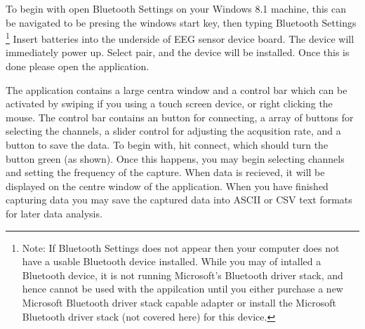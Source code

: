\documentclass[]{article}
\begin{document}
To begin with open Bluetooth Settings on your Windows 8.1 machine, this can be navigated to be presing the windows start key, then typing Bluetooth Settings \footnote{Note: If Bluetooth Settings does not appear then your computer does not have a usable Bluetooth device installed. While you may of intalled a Bluetooth device, it is not running Microsoft's Bluetooth driver stack, and hence cannot be used with the appilcation until you either purchase a new Microsoft Bluetooth driver stack capable adapter or install the Microsoft Bluetooth driver stack (not covered here) for this device.} Insert batteries into the underside of EEG sensor device board. The device will immediately power up. Select pair, and the device will be installed. Once this is done please open the application. 

The application contains a large centra window and a control bar which can be activated by swiping if you using a touch screen device, or right clicking the mouse. The control bar contains an button for connecting, a array of buttons for selecting the channels, a slider control for adjusting the acqusition rate, and a button to save the data. To begin with, hit connect, which should turn the button green (as shown). Once this happens, you may begin selecting channels and setting the frequency of the capture. When data is recieved, it will be displayed on the centre window of the application. When you have finished capturing data you may save the captured data into ASCII or CSV text formats for later data analysis. 
\end{document}

